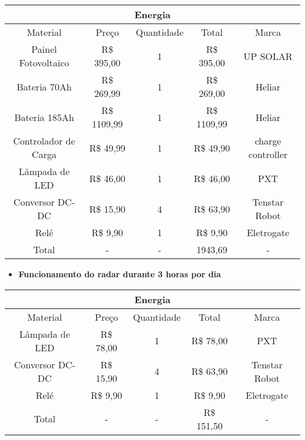 \begin{table}[H]
\begin{tabular}{|c|c|c|c|c|}
\hline
\multicolumn{5}{|c|}{Energia}                                                 \\ \hline
Material             & Preço         & Quantidade & Total         & Marca     \\ \hline
Painel Fotovoltaico  & R\$ 395,00  & 1          & R\$ 395,00  & UP SOLAR    \\ \hline
Bateria 70Ah             & R\$ 269,99  & 1          & R\$ 269,00  & Heliar  \\ \hline
Bateria 185Ah             & R\$ 1109,99  & 1          & R\$ 1109,99  & Heliar  \\ \hline
Controlador de Carga & R\$ 49,99  & 1          & R\$ 49,90  & charge controller \\ \hline
Lâmpada de LED       & R\$ 46,00 & 1          & R\$ 46,00 & PXT         \\ \hline
Conversor DC-DC       & R\$ 15,90 & 4          & R\$ 63,90 & Tenstar Robot         \\ \hline
Relé       & R\$ 9,90 & 1          & R\$ 9,90 & Eletrogate         \\ \hline
Total & - & - & 1943,69 & - \\ \hline
\end{tabular}
\end{table}



\begin{itemize}
    \item \textbf{Funcionamento do radar durante 3 horas por dia}
\end{itemize}
\begin{table}[H]
\begin{tabular}{|c|c|c|c|c|}
\hline
\multicolumn{5}{|c|}{Energia}                                                 \\ \hline
Material             & Preço         & Quantidade & Total         & Marca     \\ \hline
Lâmpada de LED       & R\$ 78,00 & 1          & R\$ 78,00 & PXT         \\ \hline
Conversor DC-DC       & R\$ 15,90 & 4          & R\$ 63,90 & Tenstar Robot         \\ \hline
Relé       & R\$ 9,90 & 1          & R\$ 9,90 & Eletrogate         \\ \hline
Total & - & - & R\$ 151,50 & - \\ \hline
\end{tabular}
\end{table}





